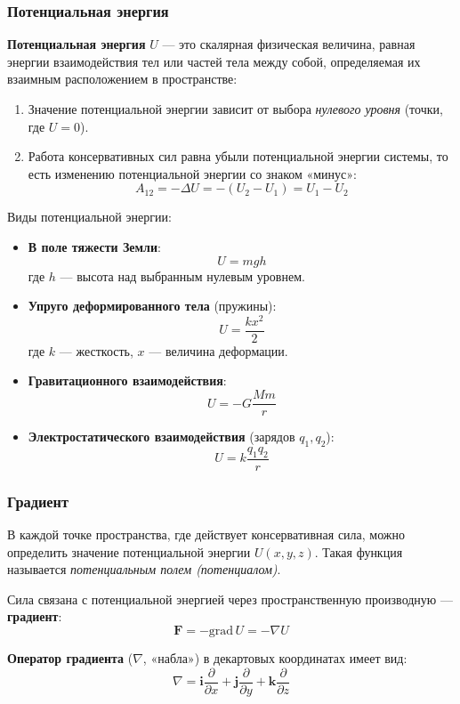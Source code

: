 \subsubsection{Потенциальная энергия}

\textbf{Потенциальная энергия} $U$ --- это скалярная физическая величина, равная энергии взаимодействия тел или частей тела между собой, определяемая их взаимным расположением в пространстве:

\begin{enumerate}
    \item Значение потенциальной энергии зависит от выбора \textit{нулевого уровня} (точки, где $U=0$).
    \item Работа консервативных сил равна убыли потенциальной энергии системы, то есть изменению потенциальной энергии со знаком «минус»:
    \[
    A_{12} = -\Delta U = -(U_2 - U_1) = U_1 - U_2
    \]
\end{enumerate}

Виды потенциальной энергии:
\begin{itemize}
    \item \textbf{В поле тяжести Земли}:
    \[
    U = mgh
    \]
    где $h$ --- высота над выбранным нулевым уровнем.
    
    \item \textbf{Упруго деформированного тела} (пружины):
    \[
    U = \frac{kx^2}{2}
    \]
    где $k$ --- жесткость, $x$ --- величина деформации.
    
    \item \textbf{Гравитационного взаимодействия}:
    \[
    U = -G\frac{M m}{r}
    \]
    
    \item \textbf{Электростатического взаимодействия} (зарядов $q_1, q_2$):
    \[
    U = k\frac{q_1 q_2}{r}
    \]
\end{itemize}

\subsubsection{Градиент}
В каждой точке пространства, где действует консервативная сила, можно определить значение потенциальной энергии $U(x, y, z)$. Такая функция называется \textit{потенциальным полем (потенциалом)}.

Сила связана с потенциальной энергией через пространственную производную — \textbf{градиент}:
\[
\mathbf{F} = -\text{grad}\, U = -\nabla U
\]

\textbf{Оператор градиента} ($\nabla$, «набла») в декартовых координатах имеет вид:
\[
\nabla = \mathbf{i}\frac{\partial}{\partial x} + \mathbf{j}\frac{\partial}{\partial y} + \mathbf{k}\frac{\partial}{\partial z}
\]


